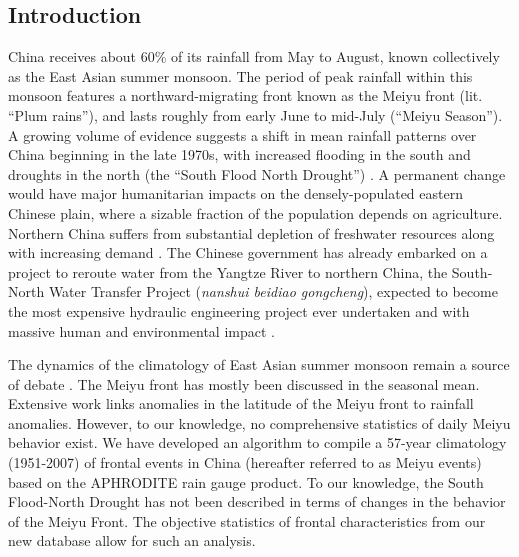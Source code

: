 \documentclass[draft,grl]{AGUTeX}
\begin{document}
\begin{article}



\section{Introduction}
 
 China receives about 60\% of its rainfall from May to August, known collectively as the East Asian summer monsoon. The period of peak rainfall within this monsoon features a northward-migrating front known as the Meiyu front (lit. ``Plum rains''), and lasts roughly from early June to mid-July (``Meiyu Season''). A growing volume of evidence suggests a shift in mean rainfall patterns over China beginning in the late 1970s, with increased flooding in the south and droughts in the north (the ``South Flood North Drought'') \citep{Hu1997,Gong2002}. A permanent change would have major humanitarian impacts on the densely-populated eastern Chinese plain, where a sizable fraction of the population depends on agriculture. Northern China suffers from substantial depletion of freshwater resources along with increasing demand \citep{Currell2012,Gleeson2012}. The Chinese government has already embarked on a project to reroute water from the Yangtze River to northern China, the South-North Water Transfer Project (\textit{nanshui beidiao gongcheng}), expected to become the most expensive hydraulic engineering project ever undertaken and with massive human and environmental impact \citep{Magee2011}.
 
	The dynamics of the climatology of East Asian summer monsoon remain a source of debate \citep{Sampe2010,Chen2014}. The Meiyu front has mostly been discussed in the seasonal mean\citep{Ding2005}. Extensive work links anomalies in the latitude of the Meiyu front to rainfall anomalies\citep{Kosaka2011}. However, to our knowledge, no comprehensive statistics of daily Meiyu behavior exist. We have developed an algorithm to compile a 57-year climatology (1951-2007) of frontal events in China (hereafter referred to as Meiyu events) based on the APHRODITE rain gauge product. To our knowledge, the South Flood-North Drought has not been described in terms of changes in the behavior of the Meiyu Front. The objective statistics of frontal characteristics from our new database allow for such an analysis.
	

\end{article}
\end{document}
